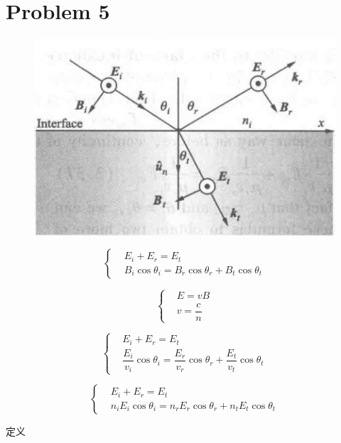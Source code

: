 \documentclass{article}
\begin{document}
\section{Problem 5}

\begin{figure}[H]
  \centering
  \includegraphics[width=0.5\linewidth]{figures/Fresnel-perpendicular}
  \label{fig:}
\end{figure}

\begin{equation*}
 \left\{
  \begin{aligned}
    & E_i + E_r = E_t \\
    & B_i \cos \theta_i = B_r \cos \theta_r + B_t \cos \theta_t
  \end{aligned}
  \right.
\end{equation*}

\begin{equation*}
  \left\{
  \begin{aligned}
    & E = v B \\
    & v = \dfrac{c}{n}
  \end{aligned}
  \right.
\end{equation*}

\begin{equation*}
 \left\{
  \begin{aligned}
    & E_i + E_r = E_t \\
    & \dfrac{E_i}{v_i}  \cos \theta_i = \dfrac{E_r}{v_r}  \cos \theta_r + \dfrac{E_t}{v_t}  \cos \theta_t
  \end{aligned}
  \right.
\end{equation*}

\begin{equation*}
 \left\{
  \begin{aligned}
    & E_i + E_r = E_t \\
    & n_i E_i \cos \theta_i = n_r E_r \cos \theta_r + n_t E_t \cos \theta_t
  \end{aligned}
  \right.
\end{equation*}

定义
\end{document}
